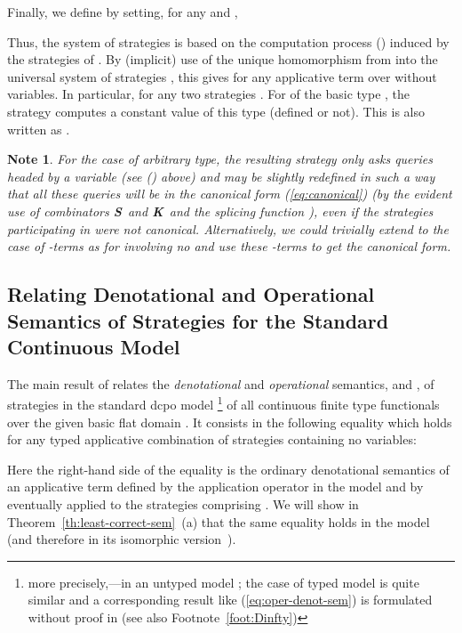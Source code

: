 \documentclass[fleqn]{LMCS}
\theoremstyle{plain}\newtheorem{satz}[thm]{Satz}
\theoremstyle{plain}\newtheorem{hyp}[thm]{Hypothesis}
\theoremstyle{plain}\newtheorem{hyps}[thm]{Hypotheses}
\theoremstyle{definition}\newtheorem{note}[thm]{Note}
\newcommand{\K}{\mbox{\bf K}}
\newcommand{\Ss}{\mbox{\bf S}}
\newcommand{\?}{\mbox{?}}
\begin{document}
Finally, we define  by setting, for any  
and , 

Thus, 
the system of strategies  
is based on the computation process () 
induced by the strategies of . 
By (implicit) use of the unique homomorphism from  
into the universal system of strategies , this 
gives  for any applicative term  over  without variables. 
In particular,  for any two strategies . 
For  of the basic type , the strategy 
 computes a constant value  
of this type (defined or not). This is also written as . 

\begin{note}\label{note:canonical}\em
For the case of arbitrary type, 
the resulting strategy  only asks queries headed by a variable 
(see () above) and 
may be slightly redefined in such a way that 
all these queries will be in the \emph{canonical}
form (\ref{eq:canonical}) 
(by the evident use of combinators \Ss\ and \K\ and the splicing function 
), 
even if the strategies participating in  were not canonical. 
Alternatively, we could trivially extend  to the case of 
-terms as  for  involving no  
and use these -terms to get the canonical form. 
\end{note}


\subsection{Relating Denotational and Operational Semantics 
of Strategies for the Standard Continuous Model 
\texorpdfstring{}{D}}
\label{sec:denot-oper}

\noindent
The main result of \cite{Saz76SMZH} relates
the {\em denotational\/} and {\em operational\/} 
semantics, 
and , of strategies in the
standard dcpo model \footnote{more precisely,---in an untyped model
	;
	the case of typed model  is quite similar
	and a corresponding result like (\ref{eq:oper-denot-sem}) 
	is formulated without proof in 
        \cite{Saz76AL} (see also Footnote~\ref{foot:Dinfty})
	 }
of all continuous finite type functionals over the given basic flat domain
. 
It consists in the
following equality which holds for any 
typed applicative combination  of
strategies containing no variables:

Here the right-hand side of the equality 
is the ordinary denotational semantics of an
applicative term defined by the application operator 
in the model 
and by  eventually applied to the strategies comprising .
We will show in Theorem~\ref{th:least-correct-sem}~(a) 
that the same equality holds in the model  
(and therefore in its isomorphic version~). 
\end{document}
